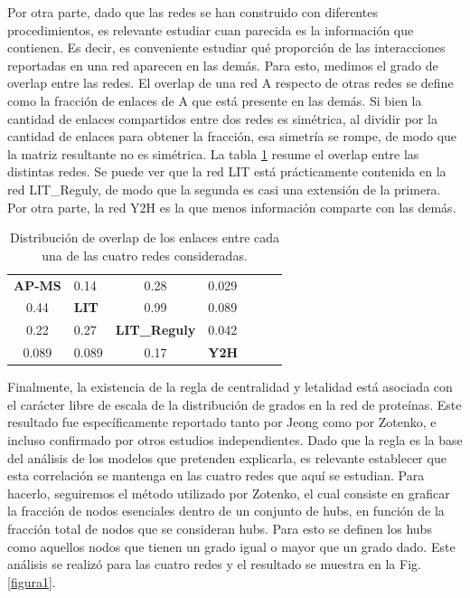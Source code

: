 \documentclass[%
 reprint,
 amsmath,amssymb,
 aps,
]{revtex4-1}
\begin{document}
Por otra parte, dado que las redes se han construido con diferentes procedimientos, es relevante estudiar cuan parecida es la informaci\'on que contienen. Es decir, es conveniente estudiar qu\'e proporci\'on de las interacciones reportadas en una red aparecen en las dem\'as. Para esto, medimos el grado de overlap entre las redes. El overlap de una red A respecto de otras redes se define como la fracci\'on de enlaces de A que est\'a presente en las dem\'as.  Si bien la cantidad de enlaces compartidos entre dos redes es sim\'etrica, al dividir por la cantidad de enlaces para obtener la fracci\'on, esa simetr\'ia se rompe, de modo que la matriz resultante no es sim\'etrica. La tabla \ref{tabla2} resume el overlap entre las distintas redes. Se puede ver que la red LIT est\'a pr\'acticamente contenida en la red LIT\_Reguly, de modo que la segunda es casi una extensi\'on de la primera. Por otra parte, la red Y2H es la que menos informaci\'on comparte con las dem\'as. 

\begin{table}[h]
\begin{ruledtabular}

\begin{tabular}{ c l c l c l c }
 {\bf AP-MS} & {0.14} & {0.28} & {0.029}\\
 {0.44} & {\bf LIT} & {0.99} & {0.089}\\
{0.22} & {0.27} & {\bf LIT\_Reguly} & {0.042}\\
 {0.089} & {0.089} & {0.17} & {\bf Y2H}\\
\end{tabular}
\end{ruledtabular}
\label{tabla2}
\caption{Distribuci\'on de overlap de los enlaces entre cada una de las cuatro redes consideradas.}
\end{table}

Finalmente, la existencia de la regla de centralidad y letalidad est\'a asociada con el car\'acter libre de escala de la distribuci\'on de grados en la red de prote\'inas. Este resultado fue espec\'ificamente reportado tanto por Jeong como por Zotenko, e incluso confirmado por otros estudios independientes. Dado que la regla es la base del an\'alisis de los modelos que pretenden explicarla, es relevante establecer que esta correlaci\'on se mantenga en las cuatro redes que aqu\'i se estudian. Para hacerlo, seguiremos el m\'etodo utilizado por Zotenko, el cual consiste en graficar la fracci\'on de nodos esenciales dentro de un conjunto de hubs, en funci\'on de la fracci\'on total de nodos que se consideran hubs. Para esto se definen los hubs como aquellos nodos que tienen un grado igual o mayor que un grado dado. Este an\'alisis se realiz\'o para las cuatro redes y el resultado se muestra en la Fig. \ref{figura1}. 
\end{document}
